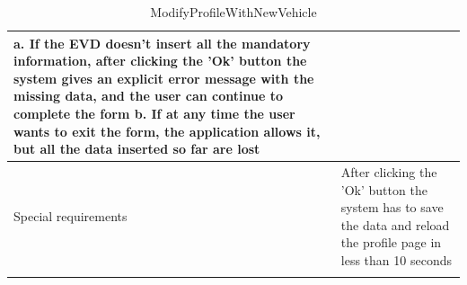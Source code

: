 \begin{center}
\begin{longtable}{p{4cm} p{11cm}}
        a. If the EVD doesn't insert all the mandatory information, after clicking the 'Ok' button the system gives an explicit error message with the missing data, and the user can continue to complete the form \newline
        b. If at any time the user wants to exit the form, the application allows it, but all the data inserted so far are lost \\
     \hline
     Special requirements & After clicking the 'Ok' button the system has to save the data and reload the profile page in less than 10 seconds \\
     \hline
    \caption{ModifyProfileWithNewVehicle}
    \label{tab:ModifyProfileWithNewVehicle}
    \end{longtable}
\end{center}

